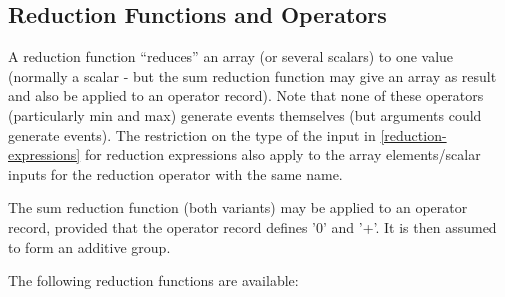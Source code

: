 \documentclass[10pt,a4paper]{report}
\def\doublelabel#1{\label{#1}\hypertarget{#1}{}}
\begin{document}
\subsection{Reduction Functions and Operators}\doublelabel{reduction-functions-and-operators}

A reduction function ``reduces'' an array (or several scalars) to one
value (normally a scalar - but the sum reduction function may give an
array as result and also be applied to an operator record). Note that
none of these operators (particularly min and max) generate events
themselves (but arguments could generate events). The restriction on the
type of the input in \ref{reduction-expressions} for reduction expressions also
apply to the array elements/scalar inputs for the reduction operator
with the same name.

The sum reduction function (both variants) may be applied to an operator
record, provided that the operator record defines '0' and '+'. It is
then assumed to form an additive group.

The following reduction functions are available:
\end{document}
